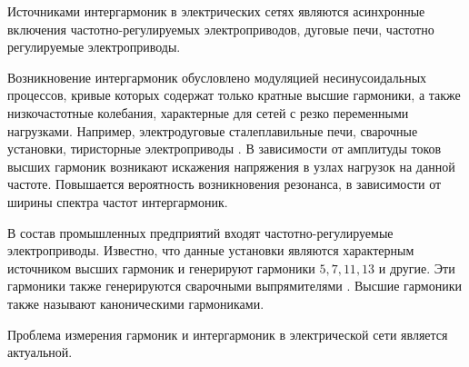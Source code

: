 Источниками интергармоник в электрических сетях являются асинхронные включения частотно-регулируемых электроприводов, дуговые печи, частотно регулируемые электроприводы. 

Возникновение интергармоник обусловлено модуляцией несинусоидальных процессов, кривые которых содержат только кратные высшие гармоники, а также низкочастотные колебания, характерные для сетей с резко переменными нагрузками. Например, электродуговые сталеплавильные печи, сварочные установки, тиристорные электроприводы \cite{Interharmonics_in_systems_Zhezhelenko_1999}. В зависимости от амплитуды токов высших гармоник возникают искажения напряжения в узлах нагрузок на данной частоте. Повышается вероятность возникновения резонанса, в зависимости от ширины спектра частот интергармоник. 

В состав промышленных предприятий входят частотно-регулируемые электроприводы. Известно, что данные установки являются характерным источником высших гармоник и генерируют гармоники $5,7,11,13$ и другие. Эти гармоники также генерируются сварочными выпрямителями \cite{Calculation_Current_Mikheev_2017}. Высшие гармоники также называют каноническими гармониками.

Проблема измерения гармоник и интергармоник в электрической сети является актуальной. \cite{testa2007интергармоники, gunther2001interharmonics, 532851, testa2002interharmonic}

 

